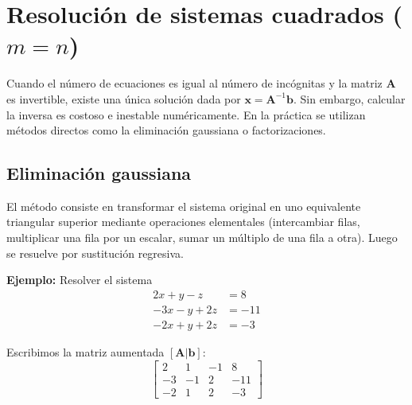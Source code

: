 \documentclass[12pt,a4paper,openany,oneside]{book}
\begin{document}
\section{Resolución de sistemas cuadrados ($m=n$)}

Cuando el número de ecuaciones es igual al número de incógnitas y la matriz $\mathbf{A}$ es invertible, existe una única solución dada por $\mathbf{x} = \mathbf{A}^{-1}\mathbf{b}$. Sin embargo, calcular la inversa es costoso e inestable numéricamente. En la práctica se utilizan métodos directos como la eliminación gaussiana o factorizaciones.

\subsection{Eliminación gaussiana}
El método consiste en transformar el sistema original en uno equivalente triangular superior mediante operaciones elementales (intercambiar filas, multiplicar una fila por un escalar, sumar un múltiplo de una fila a otra). Luego se resuelve por sustitución regresiva.

\textbf{Ejemplo:} Resolver el sistema
\begin{align*}
2x + y - z &= 8 \\
-3x - y + 2z &= -11 \\
-2x + y + 2z &= -3
\end{align*}

Escribimos la matriz aumentada $[\mathbf{A}|\mathbf{b}]$:
\[
\left[\begin{array}{ccc|c}
2 & 1 & -1 & 8 \\
-3 & -1 & 2 & -11 \\
-2 & 1 & 2 & -3
\end{array}\right]
\]
\end{document}
